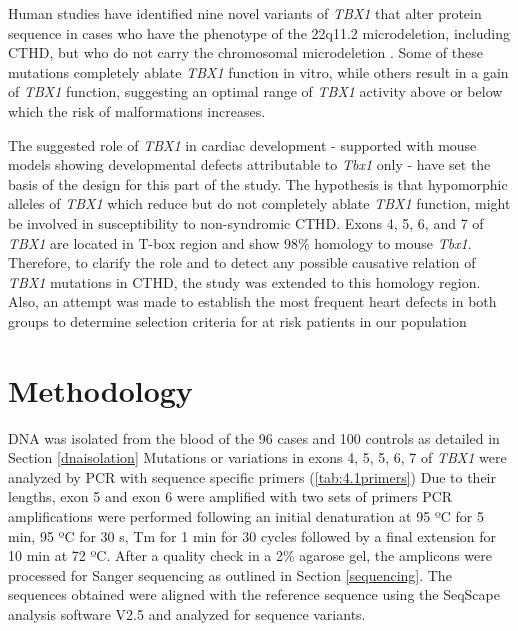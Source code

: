 \begin{refsection}
Human studies have identified nine novel variants of \textit{TBX1} that alter protein sequence in cases who have the phenotype of the 22q11.2 microdeletion, including CTHD, but who do not carry the chromosomal microdeletion \cite{gong2001mutation, lindsay2001tbx1}. Some of these mutations completely ablate \textit{TBX1} function in vitro, while others result in a gain of \textit{TBX1} function, suggesting an optimal range of \textit{TBX1} activity above or below which the risk of malformations increases. 

The suggested role of \textit{TBX1} in cardiac development - supported with mouse models showing developmental defects attributable to \textit{Tbx1} only - have set the basis of the design for this part of the study. The hypothesis is that hypomorphic alleles of \textit{TBX1} which reduce but do not completely ablate \textit{TBX1} function, might be involved in susceptibility to non-syndromic CTHD. Exons 4, 5, 6, and 7 of \textit{TBX1} are located in T-box region and show 98\% homology to mouse \textit{Tbx1}. Therefore, to clarify the role and to detect any possible causative relation of \textit{TBX1} mutations in CTHD, the study was extended to this homology region. Also, an attempt was made to establish the most frequent heart defects in both groups to determine selection criteria for at risk patients in our population

\section{Methodology}

DNA was isolated from the blood of the 96 cases and 100 controls as detailed in Section \ref{dnaisolation} Mutations or variations in exons 4, 5, 5, 6, 7 of \textit{TBX1} were analyzed by PCR with sequence specific primers (\cref{tab:4.1primers}) Due to their lengths, exon 5 and exon 6 were amplified  with two sets of primers PCR amplifications were performed following an initial denaturation at 95 ºC for 5 min, 95 ºC  for  30 s, Tm for 1 min for 30 cycles  followed by a final extension for 10 min at 72 ºC. After a quality check in a 2\% agarose gel, the amplicons were processed for Sanger sequencing as outlined in Section \ref{sequencing}. The sequences obtained were aligned with the reference sequence using the SeqScape analysis software V2.5 and analyzed for sequence variants.


\end{refsection}
